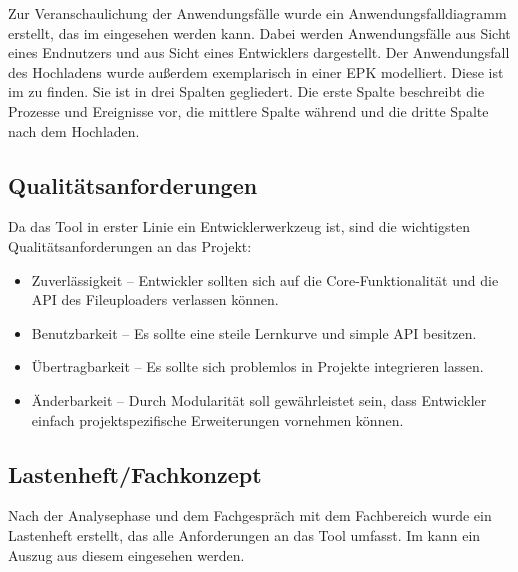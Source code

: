 Zur Veranschaulichung der Anwendungsfälle wurde ein Anwendungsfalldiagramm erstellt, das im  eingesehen werden kann. Dabei werden Anwendungsfälle aus Sicht eines Endnutzers und aus Sicht eines Entwicklers dargestellt. Der Anwendungsfall des Hochladens wurde außerdem exemplarisch in einer EPK modelliert. Diese ist im  zu finden. Sie ist in drei Spalten gegliedert. Die erste Spalte beschreibt die Prozesse und Ereignisse vor, die mittlere Spalte während und die dritte Spalte nach dem Hochladen.


\subsection{Qualitätsanforderungen}
\label{sec:Qualitaetsanforderungen}

Da das Tool in erster Linie ein Entwicklerwerkzeug ist, sind die wichtigsten Qualitätsanforderungen an das Projekt:
\begin{itemize}
	\item Zuverlässigkeit – Entwickler sollten sich auf die Core-Funktionalität und die API des Fileuploaders verlassen können.
	\item Benutzbarkeit – Es sollte eine steile Lernkurve und simple API besitzen.
	\item Übertragbarkeit – Es sollte sich problemlos in Projekte integrieren lassen.
	\item Änderbarkeit – Durch Modularität soll gewährleistet sein, dass Entwickler einfach projektspezifische Erweiterungen vornehmen können.
\end{itemize}


\subsection{Lastenheft/Fachkonzept}
\label{sec:Lastenheft}

Nach der Analysephase und dem Fachgespräch mit dem Fachbereich wurde ein Lastenheft erstellt, das alle Anforderungen an das Tool umfasst. Im  kann ein Auszug aus diesem eingesehen werden.